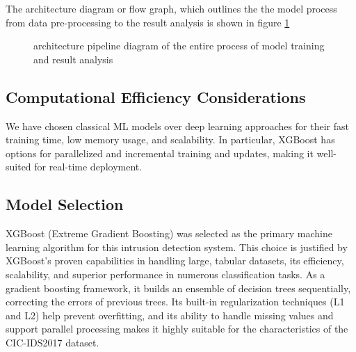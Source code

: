The architecture diagram or flow graph, which outlines the the model process from data pre-processing to the result analysis is shown in figure \ref{fig:workflow}

\begin{figure}[H]
	\caption{architecture pipeline diagram of the entire process of model training and result analysis}
	\label{fig:workflow}
\end{figure}

\subsection{Computational Efficiency Considerations} 
We have chosen classical ML models over deep learning approaches for their fast training time, low memory usage, and scalability. In particular, XGBoost has options for parallelized and incremental training and updates, making it well-suited for real-time deployment.

\subsection{Model Selection}
XGBoost (Extreme Gradient Boosting) was selected as the primary machine learning algorithm for this intrusion detection system. This choice is justified by XGBoost's proven capabilities in handling large, tabular datasets, its efficiency, scalability, and superior performance in numerous classification tasks. As a gradient boosting framework, it builds an ensemble of decision trees sequentially, correcting the errors of previous trees. Its built-in regularization techniques (L1 and L2) help prevent overfitting, and its ability to handle missing values and support parallel processing makes it highly suitable for the characteristics of the CIC-IDS2017 dataset.

